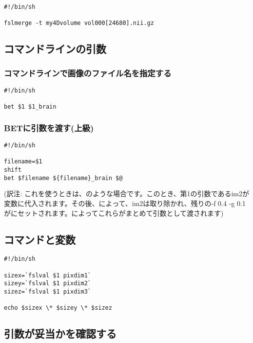 \documentclass{jsarticle}
\begin{document}
\begin{verbatim}
#!/bin/sh

fslmerge -t my4Dvolume vol000[24680].nii.gz 
\end{verbatim}

\subsection {コマンドラインの引数}

\subsubsection{コマンドラインで画像のファイル名を指定する}

\begin{verbatim}
#!/bin/sh

bet $1 $1_brain
\end{verbatim}

\subsubsection{BETに引数を渡す(上級)}

\begin{verbatim}
#!/bin/sh

filename=$1
shift
bet $filename ${filename}_brain $@
\end{verbatim}

\noindent (訳注: これを使うときは、{\color{red}}のような場合です。このとき、第1の引数であるim2が変数{\color{red}}に代入されます。その後、{\color{red}}によって、im2は取り除かれ、残りの-f 0.4 -g 0.1が{\color{red}{\tt \$1, \$2, \$3, \$4}}にセットされます。{\color{red}{\tt \$@}}によってこれらがまとめて引数として渡されます)

\subsection{コマンドと変数}

\begin{verbatim}
#!/bin/sh

sizex=`fslval $1 pixdim1`
sizey=`fslval $1 pixdim2`
sizez=`fslval $1 pixdim3`

echo $sizex \* $sizey \* $sizez
\end{verbatim}

\subsection{引数が妥当かを確認する}
\end{document}
